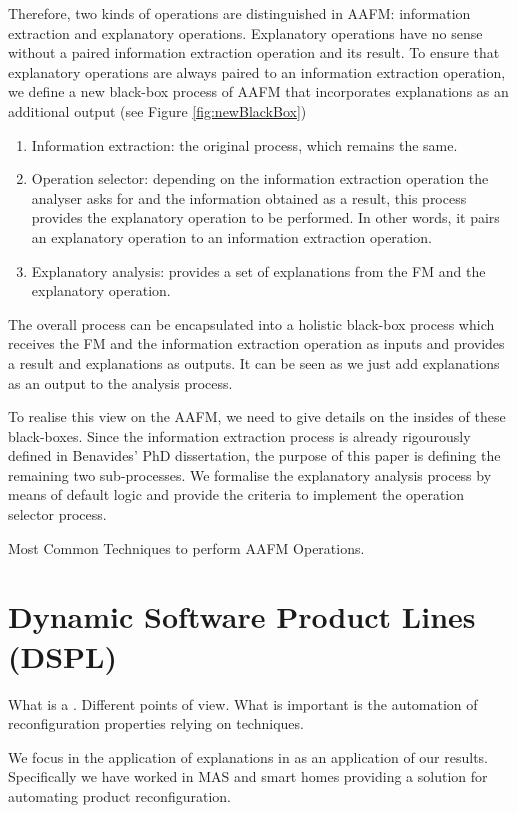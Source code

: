 
Therefore, two kinds of operations are distinguished in AAFM: information extraction and explanatory operations. Explanatory operations have no sense without a paired information extraction operation and its result. To ensure that explanatory operations are always paired to an information extraction operation, we define a new black-box process of AAFM that incorporates explanations as an additional output (see Figure \ref{fig:newBlackBox})

\begin{enumerate}
\item Information extraction: the original process, which remains the same.
\item Operation selector: depending on the information extraction operation the analyser asks for and the information obtained as a result, this process provides the explanatory operation to be performed. In other words, it pairs an explanatory operation to an information extraction operation.
\item Explanatory analysis: provides a set of explanations from the FM and the explanatory operation.
\end{enumerate} 

The overall process can be encapsulated into a holistic black-box process which receives the FM and the information extraction operation as inputs and provides a result and explanations as outputs. It can be seen as we just add explanations as an output to the analysis process. 

To realise this view on the AAFM, we need to give details on the insides of these black-boxes. Since the information extraction process is already rigourously defined in Benavides' PhD dissertation, the purpose of this paper is defining the remaining two sub-processes. We formalise the explanatory analysis process by means of default logic and provide the criteria to implement the operation selector process.

Most Common Techniques to perform AAFM Operations.


\section{Dynamic Software Product Lines (DSPL)}
What is a \dspl. Different points of view. What is important is the automation of reconfiguration properties relying on \spl techniques.

We focus in the application of explanations in \dspls as an application of our results. Specifically we have worked in MAS and smart homes providing a solution for automating product reconfiguration.

